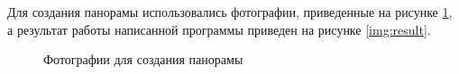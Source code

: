 Для создания панорамы использовались фотографии, приведенные на рисунке \ref{img:input_imgs}, а результат работы написанной программы приведен на рисунке \ref{img:result}.

\begin{figure}[h!]
	\caption{Фотографии для создания панорамы}
	\label{img:input_imgs}
\end{figure}

